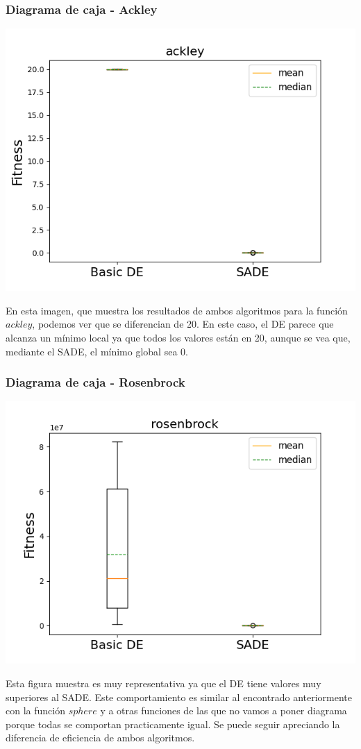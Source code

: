 \documentclass[11pt, a4paper, titlepage]{article}
\begin{document}
\subsubsection{Diagrama de caja - Ackley}
\begin{center}
\includegraphics[scale=0.85]{ackley}
\end{center}
En esta imagen, que muestra los resultados de ambos algoritmos para la función $ackley$, podemos ver que se diferencian de 20. En este caso, el DE parece que alcanza un mínimo local ya que todos los valores están en 20, aunque se vea que, mediante el SADE, el mínimo global sea 0.
\subsubsection{Diagrama de caja - Rosenbrock}
\begin{center}
\includegraphics[scale=0.85]{rosenbrock}
\end{center}
Esta figura muestra es muy representativa ya que el DE tiene valores muy superiores al SADE. Este comportamiento es similar al encontrado anteriormente con la función $sphere$ y a otras funciones de las que no vamos a poner diagrama porque todas se comportan practicamente igual. Se puede seguir apreciando la diferencia de eficiencia de ambos algoritmos.
\end{document}
